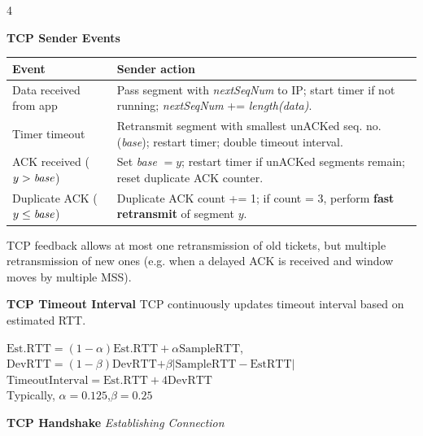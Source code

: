 \documentclass[10pt]{extarticle}
\begin{document}
\begin{multicols}{4}
\par\vspace{1pt}\noindent\begingroup\scriptsize
\textbf{TCP Sender Events}\par
\begingroup\setlength{\tabcolsep}{3pt}\renewcommand{\arraystretch}{.95}
\begin{tabular}{|>{\raggedright\arraybackslash}p{.39\linewidth}|>{\raggedright\arraybackslash}p{.52\linewidth}|}
\hline
\textbf{Event} & \textbf{Sender action} \\
\hline
Data received from app & Pass segment with \textit{nextSeqNum} to IP; start timer if not running; \textit{nextSeqNum} += \textit{length(data)}. \\
\hline
Timer timeout & Retransmit segment with smallest unACKed seq. no. (\textit{base}); restart timer; double timeout interval. \\
\hline
ACK received ($y > \text{\textit{base}}$) & Set \textit{base} $= y$; restart timer if unACKed segments remain; reset duplicate ACK counter. \\
\hline
Duplicate ACK ($y \le \text{\textit{base}}$) & Duplicate ACK count += 1; if count = 3, perform \textbf{fast retransmit} of segment $y$. \\
\hline
\end{tabular}\par\endgroup
\vspace{1pt}
\endgroup

TCP feedback allows at most one retransmission of old tickets, but multiple retransmission of new ones (e.g. when a delayed ACK is received and window moves by multiple MSS).

\textbf{TCP Timeout Interval} TCP continuously updates timeout interval based on estimated RTT.

$\text{Est.RTT} = (1-\alpha)\text{Est.RTT} +\alpha\text{SampleRTT}$,\\
$\text{DevRTT} = (1-\beta)\text{DevRTT+}\beta\left|\text{SampleRTT}-\text{EstRTT}\right|$\\
$\text{TimeoutInterval} = \text{Est.RTT}+4\text{DevRTT}$\\
Typically, $\alpha=0.125$,$\beta=0.25$

\textbf{TCP Handshake}
\textit{Establishing Connection}


\end{multicols}
\end{document}
